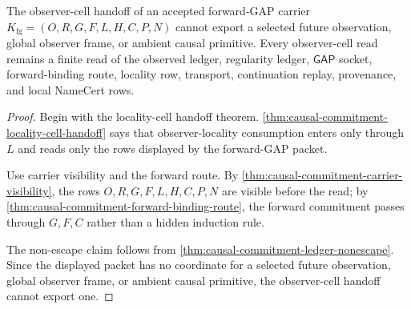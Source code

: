 \begin{theorem}
\label{thm:causal-commitment-observer-cell-nonescape}
The observer-cell handoff of an accepted forward-GAP carrier $K_{\mathrm{fg}}=(O,R,G,F,L,H,C,P,N)$ cannot export a selected future observation, global observer frame, or ambient causal primitive. Every observer-cell read remains a finite read of the observed ledger, regularity ledger, $\mathsf{GAP}$ socket, forward-binding route, locality row, transport, continuation replay, provenance, and local NameCert rows.
\end{theorem}
\begin{proof}
Begin with the locality-cell handoff theorem. \autoref{thm:causal-commitment-locality-cell-handoff} says that observer-locality consumption enters only through $L$ and reads only the rows displayed by the forward-GAP packet.

Use carrier visibility and the forward route. By \autoref{thm:causal-commitment-carrier-visibility}, the rows $O,R,G,F,L,H,C,P,N$ are visible before the read; by \autoref{thm:causal-commitment-forward-binding-route}, the forward commitment passes through $G,F,C$ rather than a hidden induction rule.

The non-escape claim follows from \autoref{thm:causal-commitment-ledger-nonescape}. Since the displayed packet has no coordinate for a selected future observation, global observer frame, or ambient causal primitive, the observer-cell handoff cannot export one.
\end{proof}

